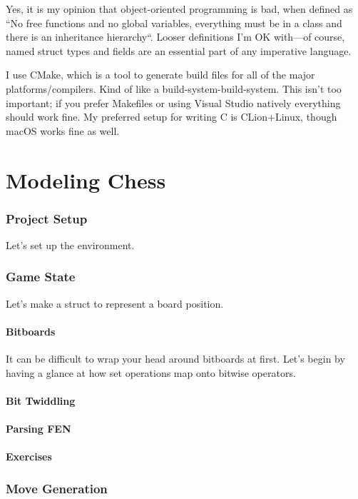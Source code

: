 \documentclass[letterpaper,11pt]{article}
\begin{document}
Yes, it is my opinion that object-oriented programming is bad, when defined as 
``No free functions and no global variables, everything must be in a class and there is an inheritance hierarchy``.
Looser definitions I'm OK with---of course, 
named struct types and fields are an essential part of any imperative language. 

I use CMake, which is a tool to generate build files for all of the major platforms/compilers. 
Kind of like a build-system-build-system. This isn't too important; if you prefer Makefiles or 
using Visual Studio natively everything should work fine. 
My preferred setup for writing C is CLion+Linux, though macOS works fine as well. 

\newpage
\part{Modeling Chess}

\section{Project Setup}

Let's set up the environment.

\section{Game State}

Let's make a struct to represent a board position.

\subsection{Bitboards}

It can be difficult to wrap your head around bitboards at first. Let's begin by having a glance at 
how set operations map onto bitwise operators.

\subsection{Bit Twiddling}
\subsection{Parsing FEN}
\subsection{Exercises}

\section{Move Generation}
\end{document}

